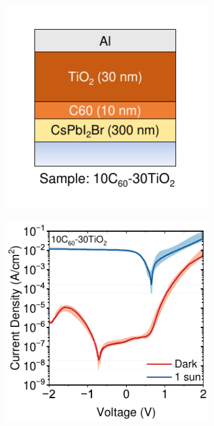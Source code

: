 \begin{figure}[t]
\begin{subfigure}[t]{0.45\textwidth}
        \caption{}
        \label{}
    \end{subfigure}
    \caption{}
    \label{}
\end{figure}



\begin{figure}[t]
    \centering
    \begin{subfigure}[t]{0.45\textwidth}
        \centering
        \includegraphics[width=\textwidth]{chapters/transport_layers/images/Sample_10_30_icon.pdf} %
        \caption{}
        \label{}
    \end{subfigure}
    \hfill
    \begin{subfigure}[t]{0.45\textwidth}
        \centering
        \includegraphics[width=\textwidth]{chapters/transport_layers/images/JV_Median_10_30.pdf} 

\end{subfigure}
\end{figure}
